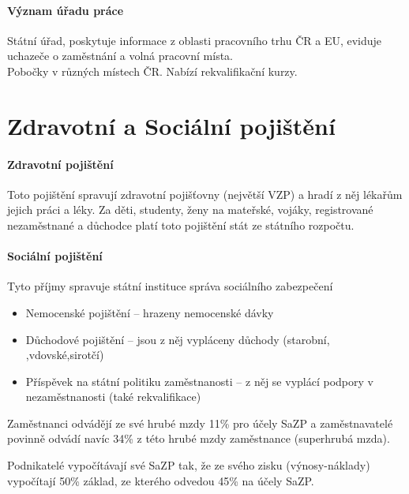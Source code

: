 \paragraph*{Význam úřadu práce}
Státní úřad, poskytuje informace z oblasti pracovního trhu ČR a EU, eviduje uchazeče o zaměstnání a volná pracovní místa. \\
Pobočky v různých místech ČR. Nabízí rekvalifikační kurzy.

\section*{Zdravotní a Sociální pojištění}
\paragraph*{Zdravotní pojištění}
Toto pojištění spravují zdravotní pojišťovny (největší VZP) a hradí z něj lékařům jejich práci a léky. Za děti, studenty, ženy na mateřské, vojáky, registrované nezaměstnané a důchodce platí toto pojištění stát ze státního rozpočtu.

\paragraph*{Sociální pojištění}
Tyto příjmy spravuje státní instituce správa sociálního zabezpečení
\begin{itemize}
    \item Nemocenské pojištění -- hrazeny nemocenské dávky
    \item Důchodové pojištění -- jsou z něj vypláceny důchody (starobní, ,vdovské,sirotčí)
    \item Příspěvek na státní politiku zaměstnanosti -- z něj se vyplácí podpory v nezaměstnanosti (také rekvalifikace)
\end{itemize}

Zaměstnanci odvádějí ze své hrubé mzdy 11\% pro účely SaZP a zaměstnavatelé povinně odvádí navíc 34\% z této hrubé mzdy zaměstnance (superhrubá mzda).

Podnikatelé vypočítávají své SaZP tak, že ze svého zisku (výnosy-náklady) vypočítají 50\% základ, ze kterého odvedou 45\% na účely SaZP.

